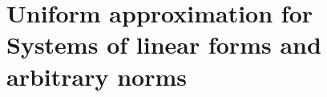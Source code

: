 \documentclass[10pt]{amsart}
\theoremstyle{definition}
\begin{document}


\section{ Uniform approximation for Systems of linear forms and arbitrary norms} \label{s12}
\end{document}
